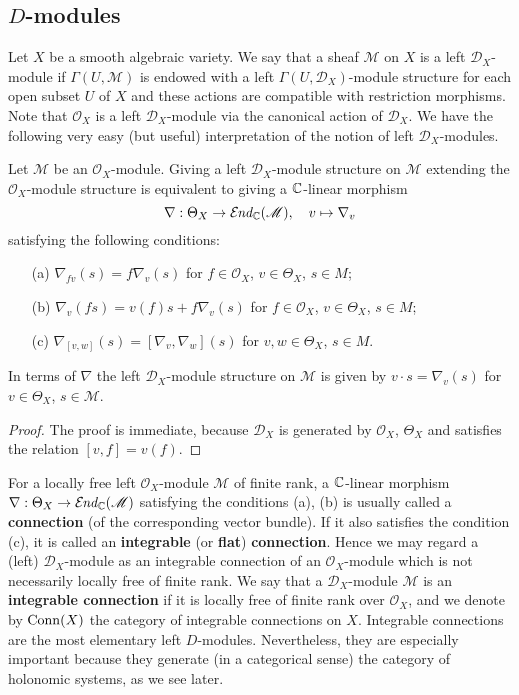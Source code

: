 \subsection{\texorpdfstring{$D$}{D}-modules}
Let $X$ be a smooth algebraic variety. We say that a sheaf $\mathscr{M}$ on $X$ is a left $\mathscr{D}_X$-module if $\Gamma(U,\mathscr{M})$ is endowed with a left $\Gamma(U,\mathscr{D}_X)$-module structure for each open subset $U$ of $X$ and these actions are compatible with restriction morphisms. Note that $\mathscr{O}_X$ is a left $\mathscr{D}_X$-module via the canonical action of $\mathscr{D}_X$. We have the following very easy (but useful) interpretation of the notion of left $\mathscr{D}_X$-modules.
\begin{lemma}\label{D-module iff flat connection}
Let $\mathscr{M}$ be an $\mathscr{O}_X$-module. Giving a left $\mathscr{D}_X$-module structure on $\mathscr{M}$ extending the $\mathscr{O}_X$-module structure is equivalent to giving a $\mathbb{C}$-linear morphism
\[\nabla:\Theta_X\to\operatorname{\mathcal{E}\hspace*{-1pt}\textit{nd}\hspace{0.5pt}}_{\mathbb{C}}(\mathscr{M}),\quad v\mapsto\nabla_v\]
satisfying the following conditions:
\begin{enumerate}
    \item[(a)] $\nabla_{fv}(s)=f\nabla_v(s)$ for $f\in\mathscr{O}_X$, $v\in\Theta_X$, $s\in M$;
    \item[(b)] $\nabla_v(fs)=v(f)s+f\nabla_v(s)$ for $f\in\mathscr{O}_X$, $v\in\Theta_X$, $s\in M$;
    \item[(c)] $\nabla_{[v,w]}(s)=[\nabla_v,\nabla_w](s)$ for $v,w\in\Theta_X$, $s\in M$.
\end{enumerate}
In terms of $\nabla$ the left $\mathscr{D}_X$-module structure on $\mathscr{M}$ is given by $v\cdot s=\nabla_v(s)$ for $v\in\Theta_X$, $s\in\mathscr{M}$.
\end{lemma}
\begin{proof}
The proof is immediate, because $\mathscr{D}_X$ is generated by $\mathscr{O}_X$, $\Theta_X$ and satisfies the relation $[v,f]=v(f)$.
\end{proof}

For a locally free left $\mathscr{O}_X$-module $\mathscr{M}$ of finite rank, a $\mathbb{C}$-linear morphism $\nabla:\Theta_X\to\operatorname{\mathcal{E}\hspace*{-1pt}\textit{nd}\hspace{0.5pt}}_{\mathbb{C}}(\mathscr{M})$ satisfying the conditions (a), (b) is usually called a \textbf{connection} (of the corresponding vector bundle). If it also satisfies the condition (c), it is called an \textbf{integrable} (or \textbf{flat}) \textbf{connection}. Hence we may regard a (left) $\mathscr{D}_X$-module as an integrable connection of an $\mathscr{O}_X$-module which is not necessarily locally free of finite rank. We say that a $\mathscr{D}_X$-module $\mathscr{M}$ is an \textbf{integrable connection} if it is locally free of finite rank over $\mathscr{O}_X$, and we denote by $\mathrm{Conn}(X)$ the category of integrable connections on $X$. Integrable connections are the most elementary left $D$-modules. Nevertheless, they are especially important because they generate (in a categorical sense) the category of holonomic systems, as we see later.

